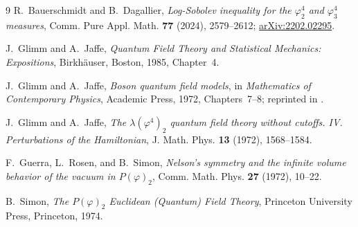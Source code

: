 \documentclass[11pt,a4paper]{article}
\theoremstyle{remark}
\begin{document}
\begin{thebibliography}{9}
R.~Bauerschmidt and B.~Dagallier,
\emph{Log-Sobolev inequality for the $\varphi^4_2$ and $\varphi^4_3$ measures},
Comm. Pure Appl. Math. \textbf{77} (2024), 2579--2612;
\href{https://arxiv.org/abs/2202.02295}{arXiv:2202.02295}.

J.~Glimm and A.~Jaffe,
\emph{Quantum Field Theory and Statistical Mechanics: Expositions},
Birkh\"auser, Boston, 1985, Chapter~4.

J.~Glimm and A.~Jaffe,
\emph{Boson quantum field models}, in \emph{Mathematics of Contemporary Physics},
Academic Press, 1972, Chapters~7--8; reprinted in \cite{GJExp}.

J.~Glimm and A.~Jaffe,
\emph{The $\lambda(\varphi^4)_2$ quantum field theory without cutoffs. IV.
Perturbations of the Hamiltonian},
J. Math. Phys. \textbf{13} (1972), 1568--1584.

F.~Guerra, L.~Rosen, and B.~Simon,
\emph{Nelson's symmetry and the infinite volume behavior of the vacuum in $P(\varphi)_2$},
Comm. Math. Phys. \textbf{27} (1972), 10--22.

B.~Simon,
\emph{The $P(\varphi)_2$ Euclidean (Quantum) Field Theory},
Princeton University Press, Princeton, 1974.
\end{thebibliography}
\end{document}
